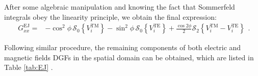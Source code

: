 %
After some algebraic manipulation and knowing the fact that Sommerfeld integrals obey the linearity principle, we obtain the final expression:
%
\begin{equation}
  \begin{split}
    G_{xx}^\mathrm{EJ} ={}& - \cos^2 \phi \, \mathcal{S}_0 \left \{ V_i^\mathrm{TM} \right \}  - \sin^2 \phi \, \mathcal{S}_0 \left \{ V_i^\mathrm{TE} \right \} + \frac{\cos 2 \phi}{2} \mathcal{S}_2 \left \{  V_i^\mathrm{TM} -  V_i^\mathrm{TE} \right \}
  \end{split}.
  \label{eq:Gxx_final_equation}
\end{equation}
%

Following similar procedure, the remaining components of both electric and magnetic fields DGFs in the spatial domain can be obtained, which are listed in Table \ref{tab:EJ} \cite{Michalski2005}.
%
